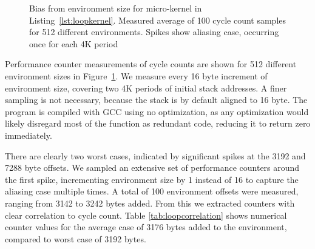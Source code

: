 \documentclass[a4paper,10pt,twocolumn,twoside]{article}
\begin{document}
\begin{figure}[t]
  \caption{Bias from environment size for micro-kernel in Listing~\ref{lst:loopkernel}. Measured average of 100 cycle count samples for 512 different environments. Spikes show aliasing case, occurring once for each 4K period}
  \label{fig:envbias}
\end{figure}

Performance counter measurements of cycle counts are shown for 512 different environment sizes in Figure~\ref{fig:envbias}.
We measure every 16 byte increment of environment size, covering two 4K periods of initial stack addresses.
A finer sampling is not necessary, because the stack is by default aligned to 16 byte.
The program is compiled with {\small{GCC}} using no optimization, as any optimization would likely disregard most of the function as redundant code, reducing it to return zero immediately.

There are clearly two worst cases, indicated by significant spikes at the 3192 and 7288 byte offsets.
We sampled an extensive set of performance counters around the first spike, incrementing environment size by 1 instead of 16 to capture the aliasing case multiple times.
A total of 100 environment offsets were measured, ranging from 3142 to 3242 bytes added.
From this we extracted counters with clear correlation to cycle count.
Table \ref{tab:loopcorrelation} shows numerical counter values for the average case of 3176 bytes added to the environment, compared to worst case of 3192 bytes.
\end{document}

